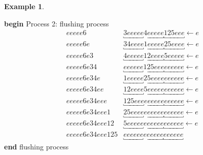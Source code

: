 \documentclass[submission]{FPSAC2021}
\theoremstyle{plain}
\theoremstyle{definition}
\newtheorem{example}[theorem]{Example}
\numberwithin{equation}{section}
\begin{document}
\begin{example}
\begin{multicols}{2}
            \columnbreak
            \begin{minipage}[H]{0.45\textwidth}
            \begin{center}
            \textbf{begin} Process 2: flushing process
            \vspace{-1em}
\begin{align*}
    eeeee6&\underbracket{3eeeee}\underbracket{4eeeee}\underbracket{125eee}\leftarrow e\\
    eeeee6e&\underbracket{34eeee}\underbracket{1eeeee}\underbracket{25eeee}\leftarrow e\\
    eeeee6e3&\underbracket{4eeeee}\underbracket{12eeee}\underbracket{5eeeee}\leftarrow e\\
    eeeee6e34&\underbracket{eeeeee}\underbracket{125eee}\underbracket{eeeeee}\leftarrow e\\
    eeeee6e34e&\underbracket{1eeeee}\underbracket{25eeee}\underbracket{eeeeee}\leftarrow e\\
    eeeee6e34ee&\underbracket{12eeee}\underbracket{5eeeee}\underbracket{eeeeee}\leftarrow e\\
    eeeee6e34eee&\underbracket{125eee}\underbracket{eeeeee}\underbracket{eeeeee}\leftarrow e\\
    eeeee6e34eee1&\underbracket{25eeee}\underbracket{eeeeee}\underbracket{eeeeee}\leftarrow e\\
    eeeee6e34eee12&\underbracket{5eeeee}\underbracket{eeeeee}\underbracket{eeeeee}\leftarrow e\\
    eeeee6e34eee125&\underbracket{eeeeee}\underbracket{eeeeee}\underbracket{eeeeee}
    \end{align*}
            \textbf{end} flushing process
            \end{center}
\end{minipage}
\end{multicols}
\end{example}
\end{document}
